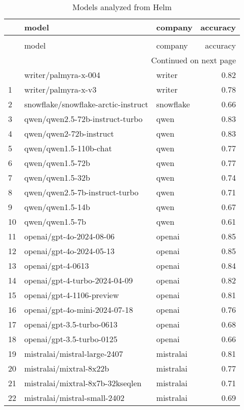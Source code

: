 \begin{longtable}{lllr}
\caption{Models analyzed from Helm} \label{tab:helmmodels} \\
\toprule
 & model & company & accuracy \\
\midrule
\endfirsthead
\caption[]{Models analyzed from Helm} \\
\toprule
 & model & company & accuracy \\
\midrule
\endhead
\midrule
\multicolumn{4}{r}{Continued on next page} \\
\midrule
\endfoot
\bottomrule
\endlastfoot
0 & writer/palmyra-x-004 & writer & 0.82 \\
1 & writer/palmyra-x-v3 & writer & 0.78 \\
2 & snowflake/snowflake-arctic-instruct & snowflake & 0.66 \\
3 & qwen/qwen2.5-72b-instruct-turbo & qwen & 0.83 \\
4 & qwen/qwen2-72b-instruct & qwen & 0.83 \\
5 & qwen/qwen1.5-110b-chat & qwen & 0.77 \\
6 & qwen/qwen1.5-72b & qwen & 0.77 \\
7 & qwen/qwen1.5-32b & qwen & 0.74 \\
8 & qwen/qwen2.5-7b-instruct-turbo & qwen & 0.71 \\
9 & qwen/qwen1.5-14b & qwen & 0.67 \\
10 & qwen/qwen1.5-7b & qwen & 0.61 \\
11 & openai/gpt-4o-2024-08-06 & openai & 0.85 \\
12 & openai/gpt-4o-2024-05-13 & openai & 0.85 \\
13 & openai/gpt-4-0613 & openai & 0.84 \\
14 & openai/gpt-4-turbo-2024-04-09 & openai & 0.82 \\
15 & openai/gpt-4-1106-preview & openai & 0.81 \\
16 & openai/gpt-4o-mini-2024-07-18 & openai & 0.76 \\
17 & openai/gpt-3.5-turbo-0613 & openai & 0.68 \\
18 & openai/gpt-3.5-turbo-0125 & openai & 0.66 \\
19 & mistralai/mistral-large-2407 & mistralai & 0.81 \\
20 & mistralai/mixtral-8x22b & mistralai & 0.77 \\
21 & mistralai/mixtral-8x7b-32kseqlen & mistralai & 0.71 \\
22 & mistralai/mistral-small-2402 & mistralai & 0.69 \\

\end{longtable}
